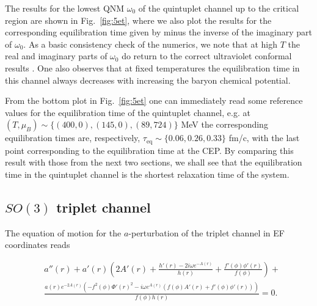 \documentclass[aps,prd,showkeys,superscriptaddress,singlecolumn,nofootinbib,floatfix]{revtex4-1}
\begin{document}
The results for the lowest QNM $\omega_0$ of the quintuplet channel up to the critical region are shown in Fig.\ \ref{fig:5et}, where we also plot the results for the corresponding equilibration time given by minus the inverse of the imaginary part of $\omega_0$. As a basic consistency check of the numerics, we note that at high $T$ the real and imaginary parts of $\omega_0$ do return to the correct ultraviolet conformal results \cite{Janik:2015waa,Rougemont:2015wca}. One also observes that at fixed temperatures the equilibration time in this channel always decreases with increasing the baryon chemical potential.

From the bottom plot in Fig.\ \ref{fig:5et} one can immediately read some reference values for the equilibration time of the quintuplet channel, e.g. at $(T,\mu_B)\sim\{(400,0),(145,0),(89,724)\}$ MeV the corresponding equilibration times are, respectively, $\tau_{\textrm{eq}}\sim\{0.06,0.26,0.33\}$ fm/c, with the last point corresponding to the equilibration time at the CEP. By comparing this result with those from the next two sections, we shall see that the equilibration time in the quintuplet channel is the shortest relaxation time of the system.


\subsection{$SO(3)$ triplet channel}
\label{sec:3et}

The equation of motion for the $a$-perturbation of the triplet channel in EF coordinates reads
\begin{widetext}
\begin{align}
&a''(r)+a'(r) \left(2 A'(r)+\frac{h'(r)-2 i \omega  e^{-A(r)}}{h(r)}+\frac{f'(\phi ) \phi '(r)}{f(\phi )}\right)+\nonumber\\
&\frac{a(r) e^{-2 A(r)} \left(-f^2(\phi ) \Phi '(r)^2-i \omega 
   e^{A(r)} \left(f(\phi ) A'(r)+f'(\phi ) \phi '(r)\right)\right)}{f(\phi ) h(r)} = 0.
\label{eq:eom3et}
\end{align}
\end{widetext}
\end{document}
